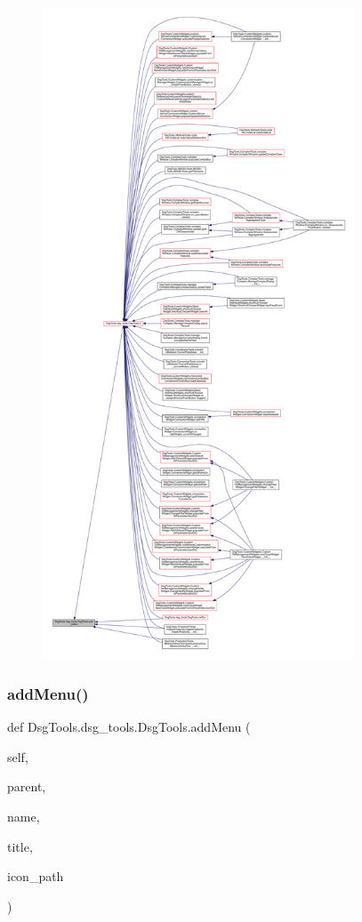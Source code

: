 \begin{figure}[H]
\begin{center}
\leavevmode
\includegraphics[height=550pt]{class_dsg_tools_1_1dsg__tools_1_1_dsg_tools_a15c3df2c1c8baf94cd08d32ca310e557_icgraph}
\end{center}
\end{figure}
\mbox{\label{class_dsg_tools_1_1dsg__tools_1_1_dsg_tools_a341a80ad74714899d12af02121495604}} 
\subsubsection{\texorpdfstring{add\+Menu()}{addMenu()}}
{\footnotesize\ttfamily def Dsg\+Tools.\+dsg\+\_\+tools.\+Dsg\+Tools.\+add\+Menu (\begin{DoxyParamCaption}\item[{}]{self,  }\item[{}]{parent,  }\item[{}]{name,  }\item[{}]{title,  }\item[{}]{icon\+\_\+path }\end{DoxyParamCaption})}

